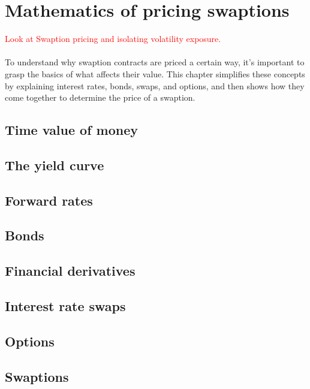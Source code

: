 \section{Mathematics of pricing swaptions}
\textcolor{red}{Look at Swaption pricing and isolating volatility exposure.}
\\\\
To understand why swaption contracts are priced a certain way, 
it's important to grasp the basics of what affects their value. 
This chapter simplifies these concepts by explaining interest rates, bonds, swaps, and options, 
and then shows how they come together to determine the price of a swaption.
\subsection{Time value of money}

\subsection{The yield curve}

\subsection{Forward rates}

\subsection{Bonds}

\subsection{Financial derivatives}

\subsection{Interest rate swaps}

\subsection{Options}

\subsection{Swaptions}
